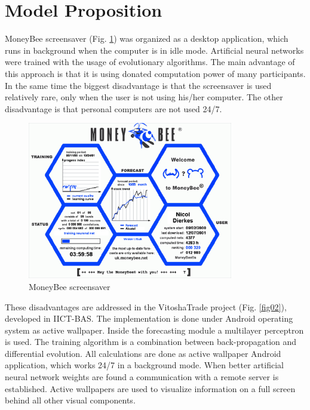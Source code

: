 \documentclass[runningheads]{llncs}
\begin{document}
\section{Model Proposition} \label{Model Proposition}

MoneyBee screensaver (Fig. \ref{fig01}) was organized as a desktop application, which runs in background when the computer is in idle mode. Artificial neural networks were trained with the usage of evolutionary algorithms. The main advantage of this approach is that it is using donated computation power of many participants. In the same time the biggest disadvantage is that the screensaver is used relatively rare, only when the user is not using his/her computer. The other disadvantage is that personal computers are not used 24/7.

\begin{figure}
\includegraphics[width=0.8\textwidth]{fig01.png}
\centering
\caption{MoneyBee screensaver} \label{fig01}
\end{figure}
\FloatBarrier

These disadvantages are addressed in the VitoshaTrade project (Fig. \ref{fig02}), developed in IICT-BAS. The implementation is done under Android operating system as active wallpaper. Inside the forecasting module a multilayer perceptron is used. The training algorithm is a combination between back-propagation and differential evolution. All calculations are done as active wallpaper Android application, which works 24/7 in a background mode. When better artificial neural network weights are found a communication with a remote server is established. Active wallpapers are used to visualize information on a full screen behind all other visual components. 
\end{document}
